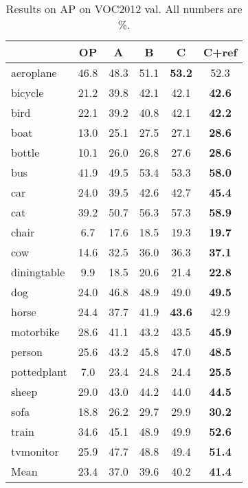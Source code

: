 \documentclass[runningheads]{llncs}
\newcommand\methodA{\textbf{A}}
\newcommand\methodB{\textbf{B}}
\newcommand\methodC{\textbf{C}}
\begin{document}
\begin{table}
\centering
\caption{Results on AP on VOC2012 val. All numbers are \%.}
\small{
\renewcommand{\tabcolsep}{1.5mm}
\begin{tabular}{l|ccccc}
 & OP & \methodA{} & \methodB{} & \methodC{} & \methodC{}+ref\\
\hline
 aeroplane & 46.8 & 48.3 & 51.1 & \textbf{53.2} & 52.3\\
 bicycle & 21.2 & 39.8 & 42.1 & 42.1 & \textbf{42.6}\\
 bird & 22.1 & 39.2 & 40.8 & 42.1 & \textbf{42.2}\\
 boat & 13.0 & 25.1 & 27.5 & 27.1 & \textbf{28.6}\\
 bottle & 10.1 & 26.0 & 26.8 & 27.6 & \textbf{28.6}\\
 bus & 41.9 & 49.5 & 53.4 & 53.3 & \textbf{58.0}\\
 car & 24.0 & 39.5 & 42.6 & 42.7 & \textbf{45.4}\\
 cat & 39.2 & 50.7 & 56.3 & 57.3 & \textbf{58.9}\\
 chair & 6.7 & 17.6 & 18.5 & 19.3 & \textbf{19.7}\\
 cow & 14.6 & 32.5 & 36.0 & 36.3 & \textbf{37.1}\\
 diningtable & 9.9 & 18.5 & 20.6 & 21.4 & \textbf{22.8}\\
 dog & 24.0 & 46.8 & 48.9 & 49.0 & \textbf{49.5}\\
 horse & 24.4 & 37.7 & 41.9 & \textbf{43.6} & 42.9\\
 motorbike & 28.6 & 41.1 & 43.2 & 43.5 & \textbf{45.9}\\
 person & 25.6 & 43.2 & 45.8 & 47.0 & \textbf{48.5}\\
 pottedplant & 7.0 & 23.4 & 24.8 & 24.4 & \textbf{25.5}\\
 sheep & 29.0 & 43.0 & 44.2 & 44.0 & \textbf{44.5}\\
 sofa & 18.8 & 26.2 & 29.7 & 29.9 & \textbf{30.2}\\
 train & 34.6 & 45.1 & 48.9 & 49.9 & \textbf{52.6}\\
 tvmonitor & 25.9 & 47.7 & 48.8 & 49.4 & \textbf{51.4}\\
\hline
 Mean & 23.4 & 37.0 & 39.6 & 40.2 & \textbf{41.4}\\
\end{tabular}
}
\label{table:APrvol}
\end{table}
\end{document}
